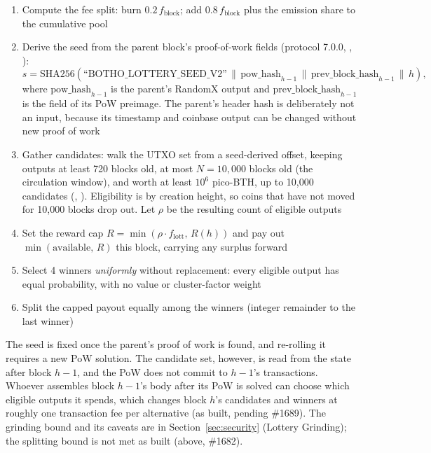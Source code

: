 \begin{enumerate}
  \item Compute the fee split: burn $0.2\,f_{\text{block}}$; add
    $0.8\,f_{\text{block}}$ plus the emission share to the cumulative pool
  \item Derive the seed from the parent block's proof-of-work fields
    (protocol 7.0.0, ,
    ):
    \begin{equation}
    s = \text{SHA256}(\text{``BOTHO\_LOTTERY\_SEED\_V2''} \,\|\, \text{pow\_hash}_{h-1} \,\|\, \text{prev\_block\_hash}_{h-1} \,\|\, h),
    \end{equation}
    where $\text{pow\_hash}_{h-1}$ is the parent's RandomX output and
    $\text{prev\_block\_hash}_{h-1}$ is the field of its PoW preimage. The
    parent's header hash is deliberately not an input, because its timestamp
    and coinbase output can be changed without new proof of work
  \item Gather candidates: walk the UTXO set from a seed-derived offset,
    keeping outputs at least 720 blocks old, at most $N = 10{,}000$ blocks old
    (the circulation window), and worth at least $10^{6}$ pico-BTH, up to
    10{,}000 candidates (,
    ). Eligibility is by
    creation height, so coins that have not moved for 10{,}000 blocks drop
    out. Let $\rho$ be the resulting count of eligible outputs
  \item Set the reward cap $R = \min(\rho \cdot f_{\text{lott}},\, R(h))$
    and pay out $\min(\text{available},\, R)$ this block, carrying any
    surplus forward
  \item Select 4 winners \emph{uniformly} without replacement: every
    eligible output has equal probability, with no value or cluster-factor
    weight
  \item Split the capped payout equally among the winners (integer
    remainder to the last winner)
\end{enumerate}

The seed is fixed once the parent's proof of work is found, and re-rolling
it requires a new PoW solution. The candidate set, however, is read from the
state after block $h-1$, and the PoW does not commit to $h-1$'s
transactions. Whoever assembles block $h-1$'s body after its PoW is solved can
choose which eligible outputs it spends, which changes block $h$'s candidates
and winners at roughly one transaction fee per alternative (as built, pending
\#1689). The grinding bound and its caveats are in
Section~\ref{sec:security} (Lottery Grinding); the splitting bound is not met
as built (above, \#1682).

